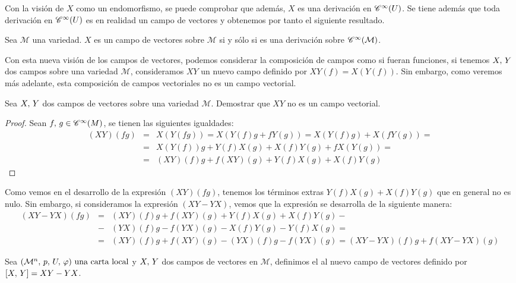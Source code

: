 Con la visión de $X$ como un endomorfismo, se puede comprobar que además, $X$ es una derivación en $\mathscr{C}^\infty(U)$.
Se tiene además que toda derivación en $\mathscr{C}^\infty(U)$ es en realidad un campo de vectores y obtenemos por tanto el
siguiente resultado.

\begin{proposition}
	\label{pro:campo-vectores-derivacion}
	Sea $\mathcal{M}$ una variedad. $X$ es un campo de vectores sobre $\mathcal{M}$ si y sólo si es una derivación
	sobre $\mathscr{C}^\infty(\mathcal{M})$.
\end{proposition}

Con esta nueva visión de los campos de vectores, podemos considerar la composición de campos como si fueran funciones,
si tenemos $X,\thinspace Y$ dos campos sobre una variedad $\mathcal{M}$, consideramos $XY$ un nuevo campo definido por $XY
(f)=X(Y(f))$.
Sin embargo, como veremos más adelante, esta composición de campos vectoriales no es un campo vectorial.

\begin{exercise}
	Sea $X,\thinspace Y$ dos campos de vectores sobre una variedad $\mathcal{M}$. Demostrar que $XY$ no es un campo vectorial.
\end{exercise}
\begin{proof}
	Sean $f,\thinspace g\in\mathscr{C}^\infty(M)$, se tienen las siguientes igualdades:
	\begin{eqnarray*}
		(XY)(fg) & = & X(Y(fg)) = X(Y(f)g+fY(g)) = X(Y(f)g)+X(fY(g))=\\
		& = & X(Y(f))g+Y(f)X(g)+X(f)Y(g)+fX(Y(g)) = \\
		& = & (XY)(f)g+f(XY)(g)+Y(f)X(g)+X(f)Y(g)
	\end{eqnarray*}
\end{proof}

Como vemos en el desarrollo de la expresión $(XY)(fg)$, tenemos los términos extras $Y(f)X(g)+X(f)Y(g)$ que en
general no es nulo.
Sin embargo, si consideramos la expresión $(XY-YX)$, vemos que la expresión se desarrolla de la siguiente manera:
\begin{eqnarray*}
	(XY-YX)(fg) & = & (XY)(f)g+f(XY)(g)+Y(f)X(g)+X(f)Y(g) - \\
	& - & (YX)(f)g-f(YX)(g)-X(f)Y(g)-Y(f)X(g) = \\
	& = & (XY)(f)g+f(XY)(g) - (YX)(f)g-f(YX)(g) = (XY-YX)(f)g+ f(XY-YX)(g)
\end{eqnarray*}


\begin{definition}
	Sea $(\mathcal{M}^n,\thinspace p,\thinspace U,\thinspace \varphi)\textmd{ una carta local}$ y $X,\thinspace Y$ dos campos de vectores en $\mathcal{M}$, definimos el  al nuevo campo de vectores definido por $[X,\thinspace Y]=XY-YX$.
\end{definition}

